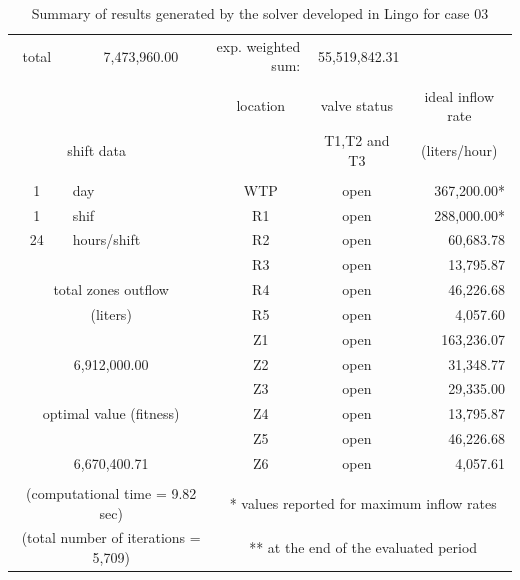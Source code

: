\documentclass{singlecol}
\theoremstyle{TH}{
\newtheorem{lemma}{Lemma}
\newtheorem{theorem}[lemma]{Theorem}
\newtheorem{corrolary}[lemma]{Corrolary}
\newtheorem{conjecture}[lemma]{Conjecture}
\newtheorem{proposition}[lemma]{Proposition}
\newtheorem{claim}[lemma]{Claim}
\newtheorem{stheorem}[lemma]{Wrong Theorem}
\newtheorem{algorithm}{Algorithm}
}
\theoremstyle{THrm}{
\newtheorem{definition}{Definition}[section]
\newtheorem{question}{Question}[section]
\newtheorem{remark}{Remark}
\newtheorem{scheme}{Scheme}
}
\theoremstyle{THhit}{
\newtheorem{case}{Case}[section]
}
\begin{document}
\begin{table}[t]
\begin{center}
\begin{small}
\begin{tabular}{ c r r r r r }
	    total & 7,473,960.00 & \multicolumn{2}{r}{exp. weighted sum:} & 55,519,842.31 &              \\
		   \\
		&  &      &  \multicolumn{1}{c}{location}    & \multicolumn{1}{c}{valve status} & \multicolumn{1}{c}{ideal inflow rate}   \\
		\multicolumn{2}{c}{shift data}     &   &      & \multicolumn{1}{c}{T1,T2 and T3} & \multicolumn{1}{c}{(liters/hour)} \\
		   \\
		1   &  \multicolumn{1}{l}{day}   &              	& \multicolumn{1}{c}{WTP} & \multicolumn{1}{c}{open} &  367,200.00* \\
		1   &  \multicolumn{1}{l}{shif}  &         			& \multicolumn{1}{c}{R1}  & \multicolumn{1}{c}{open} &  288,000.00* \\
		24  &  \multicolumn{1}{l}{hours/shift}        &     & \multicolumn{1}{c}{R2}  & \multicolumn{1}{c}{open} &   60,683.78  \\
	   &      &              								& \multicolumn{1}{c}{R3}  & \multicolumn{1}{c}{open} &   13,795.87  \\
	   \multicolumn{3}{c}{total zones outflow}              & \multicolumn{1}{c}{R4}  & \multicolumn{1}{c}{open} &   46,226.68  \\
	   \multicolumn{3}{c}{(liters)}              		    & \multicolumn{1}{c}{R5}  & \multicolumn{1}{c}{open} &    4,057.60  \\
	   &      &              								& \multicolumn{1}{c}{Z1}  & \multicolumn{1}{c}{open} &  163,236.07  \\
	   \multicolumn{3}{c}{6,912,000.00}              		& \multicolumn{1}{c}{Z2}  & \multicolumn{1}{c}{open} &   31,348.77  \\
	      &              &              					& \multicolumn{1}{c}{Z3}  & \multicolumn{1}{c}{open} &   29,335.00  \\
	   \multicolumn{3}{c}{optimal value (fitness)}          & \multicolumn{1}{c}{Z4}  & \multicolumn{1}{c}{open} &   13,795.87  \\
	   &             &             						 	& \multicolumn{1}{c}{Z5}  & \multicolumn{1}{c}{open} &   46,226.68  \\
	   \multicolumn{3}{c}{6,670,400.71}                     & \multicolumn{1}{c}{Z6}  & \multicolumn{1}{c}{open} &    4,057.61 \\
	   \\
	   \multicolumn{3}{c}{(computational time  = 9.82 sec)}     & \multicolumn{3}{c}{* values reported for maximum inflow rates} \\
	   \multicolumn{3}{c}{(total number of iterations = 5,709)}   & \multicolumn{3}{c}{** at the end of the evaluated period} 
	\end{tabular}
		\end{small}
\caption{Summary of results generated by the solver developed in Lingo for case 03}
\label{tab:lingoEvalCase03}
\end{center}
\end{table}
\end{document}
